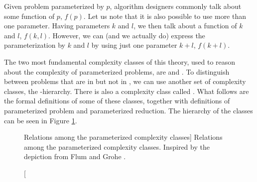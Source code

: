 Given problem parameterized by $p$, algorithm designers commonly talk about some function of $p$, $f(p)$.
Let us note that it is also possible to use more than one parameter.
Having parameters $k$ and $l$, we then talk about a function of $k$ and $l$, $f(k,l)$.
However, we can (and we actually do) express the parameterization by $k$ and $l$ by using just one parameter $k+l$, $f(k+l)$.

The two most fundamental complexity classes of this theory, used to reason about the complexity of parameterized problems,
are \FPT and \XP.
To distinguish between \NPh problems that are in \XP but not in \FPT, we can use another set of complexity classes, the \W-hierarchy.
There is also a complexity class called \pNP.
What follows are the formal definitions of some of these classes, together with definitions of parameterized problem
and parameterized reduction.
The hierarchy of the classes can be seen in Figure \ref{fig:complexityClasses}.


\begin{figure}[t]
    \centering
    \caption
    [Relations among the parameterized complexity classes]
    {
        Relations among the parameterized complexity classes.
        Inspired by the depiction from Flum and Grohe \cite[p.~97]{Flum2006}.
    }
    \label{fig:complexityClasses}
\end{figure}


